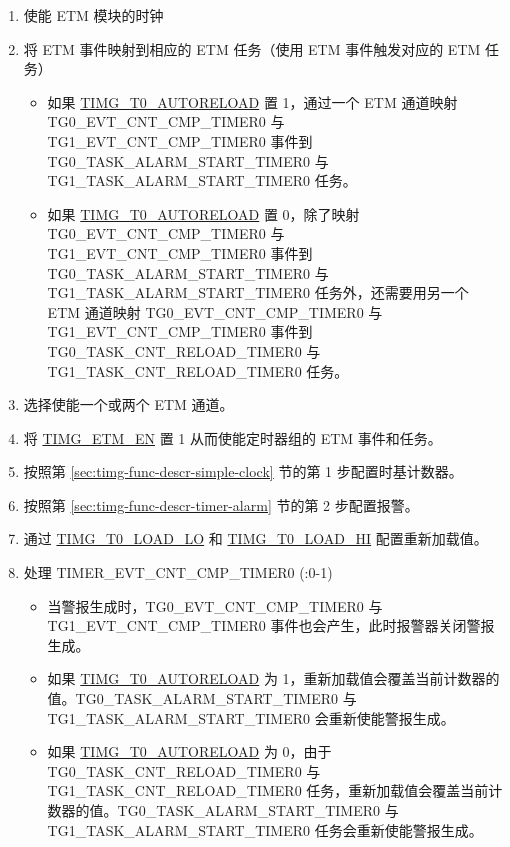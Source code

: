 \documentclass[main\_\_CN.tex]{subfiles}
\begin{document}
\begin{enumerate}
    \item 使能 ETM 模块的时钟
    \item 将 ETM 事件映射到相应的 ETM 任务（使用 ETM 事件触发对应的 ETM 任务）
    \begin{itemize}
        \item 如果 \hyperref[fielddesc:TIMGTXAUTORELOAD]{TIMG\_T0\_AUTORELOAD} 置 1，通过一个 ETM 通道映射 TG0\_EVT\_CNT\_CMP\_TIMER0 与 TG1\_EVT\_CNT\_CMP\_TIMER0 事件到 TG0\_TASK\_ALARM\_START\_TIMER0 与 TG1\_TASK\_ALARM\_START\_TIMER0 任务。
        \item 如果 \hyperref[fielddesc:TIMGTXAUTORELOAD]{TIMG\_T0\_AUTORELOAD} 置 0，除了映射 TG0\_EVT\_CNT\_CMP\_TIMER0 与 TG1\_EVT\_CNT\_CMP\_TIMER0 事件到TG0\_TASK\_ALARM\_START\_TIMER0 与 TG1\_TASK\_ALARM\_START\_TIMER0 任务外，还需要用另一个 ETM 通道映射 TG0\_EVT\_CNT\_CMP\_TIMER0 与 TG1\_EVT\_CNT\_CMP\_TIMER0 事件到 TG0\_TASK\_CNT\_RELOAD\_TIMER0 与 TG1\_TASK\_CNT\_RELOAD\_TIMER0 任务。
    \end{itemize}
    \item 选择使能一个或两个 ETM 通道。
    \item 将 \hyperref[fielddesc:TIMGETMEN]{TIMG\_ETM\_EN} 置 1 从而使能定时器组的 ETM 事件和任务。
    \item 按照第 \ref{sec:timg-func-descr-simple-clock} 节的第 1 步配置时基计数器。
    \item 按照第 \ref{sec:timg-func-descr-timer-alarm} 节的第 2 步配置报警。
    \item 通过 \hyperref[fielddesc:TIMGTXLOADLO]{TIMG\_T0\_LOAD\_LO} 和 \hyperref[fielddesc:TIMGTXLOADHI]{TIMG\_T0\_LOAD\_HI} 配置重新加载值。
    \item 处理 TIMER\_EVT\_CNT\_CMP\_TIMER0 (:0-1)
    \begin{itemize}
        \item 当警报生成时，TG0\_EVT\_CNT\_CMP\_TIMER0 与 TG1\_EVT\_CNT\_CMP\_TIMER0 事件也会产生，此时报警器关闭警报生成。
        \item 如果 \hyperref[fielddesc:TIMGTXAUTORELOAD]{TIMG\_T0\_AUTORELOAD} 为 1，重新加载值会覆盖当前计数器的值。TG0\_TASK\_ALARM\_START\_TIMER0 与 TG1\_TASK\_ALARM\_START\_TIMER0 会重新使能警报生成。
        \item 如果 \hyperref[fielddesc:TIMGTXAUTORELOAD]{TIMG\_T0\_AUTORELOAD} 为 0，由于 TG0\_TASK\_CNT\_RELOAD\_TIMER0 与 TG1\_TASK\_CNT\_RELOAD\_TIMER0 任务，重新加载值会覆盖当前计数器的值。TG0\_TASK\_ALARM\_START\_TIMER0 与 TG1\_TASK\_ALARM\_START\_TIMER0 任务会重新使能警报生成。

\end{itemize}
\end{enumerate}
\end{document}
